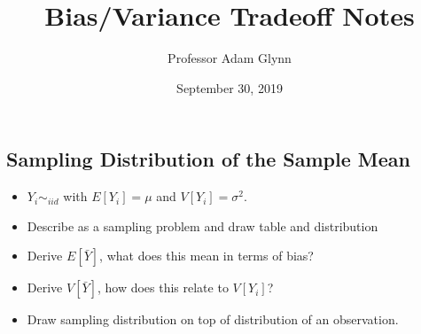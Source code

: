 \documentclass[10pt,letter]{article}
\begin{document}
\title{Bias/Variance Tradeoff Notes}

\author{Professor Adam Glynn}

\date{September 30, 2019}

\maketitle 
\noindent

\subsection*{Sampling Distribution of the Sample Mean}
\begin{itemize}
\item $Y_i \sim_{iid}$ with $E[Y_i]=\mu$ and $V[Y_i]=\sigma^2$.
\item Describe as a sampling problem and draw table and distribution
\item Derive $E[\bar{Y}]$, what does this mean in terms of bias?
\item Derive $V[\bar{Y}]$, how does this relate to $V[Y_i]$?
\item Draw sampling distribution on top of distribution of an observation.
\end{itemize}
\end{document}
